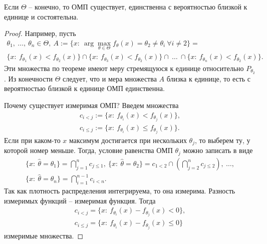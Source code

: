\begin{corollary}
    Если $\displaystyle \Theta $ -- конечно, то ОМП существует, единственна с вероятностью близкой к единице и состоятельна.
\end{corollary}
\begin{proof}
    Например, пусть
        \begin{gather*}
        \theta _{1} ,\ \dotsc ,\ \theta _{n} \in \Theta ,\ A:=\{x:\ \arg\max_{\theta \in \Theta } f_{\theta }( x) =\theta _{2} \neq \theta _{i} \ \forall i\neq 2\} =\\
        \{x:\ f_{\theta _{1}}( x) < f_{\theta _{2}}( x)\} \cap \{x:\ f_{\theta _{3}}( x) < f_{\theta _{2}}( x)\} \cap \ \dotsc \ \cap \{x:\ f_{\theta _{n}}( x) < f_{\theta _{2}}( x)\} .
    \end{gather*}
    Эти множества по теореме имеют меру стремящуюся к единице относительно $\displaystyle P_{\theta _{2}}$. Из конечности $\displaystyle \Theta $ следует, что и мера множества $\displaystyle A$ близка к единице, то есть с вероятностью близкой к единице ОМП единственна. 
    
    Почему существует измеримая ОМП? Введем множества
    \begin{gather*}
        c_{i< j} :=\{x:\ f_{\theta _{i}}( x) < f_{\theta _{j}}( x)\} ,\\
        c_{i\leqslant j} :=\{x:\ f_{\theta _{i}}( x) \leqslant f_{\theta _{j}}( x)\} .
    \end{gather*}
    Если при каком-то $\displaystyle x$ максимум достигается при нескольких $\displaystyle \theta _{j}$, то выберем ту, у которой номер меньше. Тогда, условие равенства ОМП $\displaystyle \theta _{j}$ можно записать в виде
    \begin{gather*}
        \{x:\ \hat{\theta } =\theta _{1}\} =\bigcap _{j=1}^{n} c_{j\leqslant 1} ,\ \{x:\ \hat{\theta } =\theta _{2}\} =c_{1< 2} \cap \left(\bigcap _{j=2}^{n} c_{j\leqslant 2}\right) ,\ \dotsc ,\\
        \{x:\ \hat{\theta } =\theta _{n}\} =\bigcap _{i=1}^{n-1} c_{i< n} .
    \end{gather*}
    Так как плотность распределения интегрируема, то она измерима. Разность измеримых функций -- измеримая функция. Тогда
    \begin{gather*}
        c_{i< j} =\{x:\ f_{\theta _{i}}( x) -f_{\theta _{j}}( x) < 0\} ,\\
        c_{i\leqslant j} =\{x:\ f_{\theta _{i}}( x) -f_{\theta _{j}}( x) \leqslant 0\}
    \end{gather*}
измеримые множества.
\end{proof}

